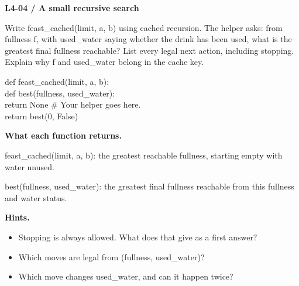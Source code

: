 \documentclass[11pt,a4paper]{article}
\begin{document}
\par\noindent\begin{minipage}{\linewidth}
\textbf{L4-04 / A small recursive search}\par\smallskip Write feast\_cached(limit, a, b) using cached recursion. The helper asks: from fullness f, with used\_water saying whether the drink has been used, what is the greatest final fullness reachable? List every legal next action, including stopping. Explain why f and used\_water belong in the cache key.\par
\par{}\par\smallskip\noindent\colorbox{codepaper}{\parbox{\dimexpr\linewidth-2\fboxsep\relax}{\small\ttfamily\raggedright def feast\_cached(limit, a, b):\\\hspace*{2.4em}def best(fullness, used\_water):\\\hspace*{4.8em}return None  \# Your helper goes here.\\\hspace*{2.4em}return best(0, False)}}\par
{\small\textbf{What each function returns.}\par feast\_cached(limit, a, b): the greatest reachable fullness, starting empty with water unused.\par best(fullness, used\_water): the greatest final fullness reachable from this fullness and water status.\par }
{\small\textbf{Hints.}}\begin{itemize}\item Stopping is always allowed. What does that give as a first answer?\item Which moves are legal from (fullness, used\_water)?\item Which move changes used\_water, and can it happen twice?\end{itemize}
\end{minipage}\par\vspace{4mm}
\end{document}

